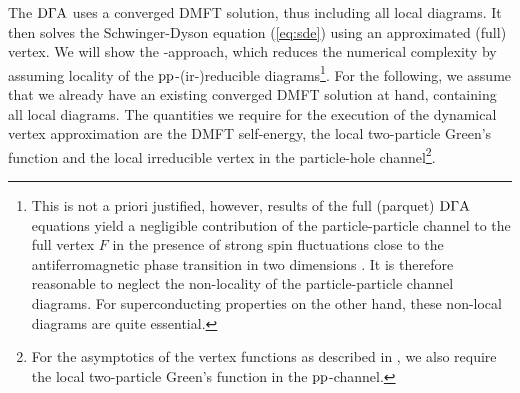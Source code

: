 \documentclass[../../main.tex]{subfiles}
\begin{document}
The $\text{D}\Gamma\text{A}$ uses a converged DMFT solution, thus including all local diagrams. It then solves the Schwinger-Dyson equation (\ref{eq:sde}) using an approximated (full) vertex. We will show the -approach, which reduces the numerical complexity by assuming locality of the $\text{pp}$-(ir-)reducible diagrams\footnote{This is not a priori justified, however, results of the full (parquet) $\text{D}\Gamma\text{A}$ equations yield a negligible contribution of the particle-particle channel to the full vertex $F$ in the presence of strong spin fluctuations close to the antiferromagnetic phase transition in two dimensions \cite{kat.tos.held 2008}. It is therefore reasonable to neglect the non-locality of the particle-particle channel diagrams. For superconducting properties on the other hand, these non-local diagrams are quite essential.}. For the following, we assume that we already have an existing converged DMFT solution at hand, containing all local diagrams. The quantities we require for the execution of the dynamical vertex approximation are the DMFT self-energy, the local two-particle Green's function and the local irreducible vertex in the particle-hole channel\footnote{For the asymptotics of the vertex functions as described in , we also require the local two-particle Green's function in the $\text{pp}$-channel.}.
\end{document}
